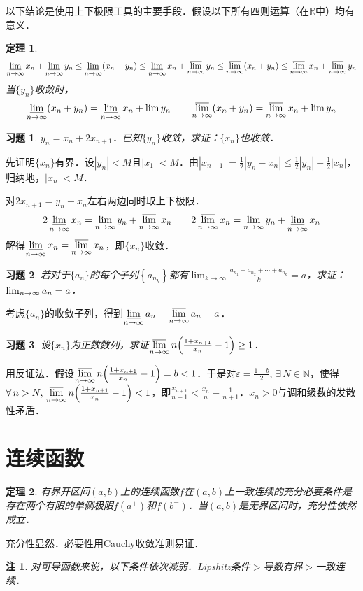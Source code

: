 \documentclass[11pt,a4paper]{ctexart}
\makeatletter
\theoremstyle{thmseries} %
\newtheorem{thm}{定理}[section]
\theoremstyle{exerseries}
\newtheorem{exer}{习题}[section]
\newtheorem*{rem}{注}
\renewenvironment{proof}[1][\proofname]{\par
  \pushQED{\qed}%
  \normalfont \topsep6\p@\@plus6\p@\relax
  \trivlist
  \item[\hskip\labelsep
        \itshape
    #1\@addpunct{}]\ignorespaces
}{%
  \popQED\endtrivlist\@endpefalse
}
\newenvironment{pf}{\begin{proof}[\bfseries\upshape 证\quad]}{\end{proof}}
\newcommand{\bra}[1]{\mathopen{}\left(#1\right)}
\newcommand{\cbra}[1]{\mathopen{}\left\{#1\right\}}
\renewcommand{\epsilon}{\varepsilon}
\newcommand{\R}{\mathbb{R}}
\newcommand{\N}{\mathbb{N}}
\def \nti {\mathnormal{n}\to\infty}
\DeclareMathOperator{\llim}{\underset{\nti}{\underline{\lim}}}
\DeclareMathOperator{\ulim}{\underset{\nti}{\overline{\lim}}}
\makeatother
\begin{document}
以下结论是使用上下极限工具的主要手段．假设以下所有四则运算（在$\overline{\R}$中）均有意义．
\begin{thm}
	\[\llim x_n+\llim y_n\leq\llim\bra{x_n+y_n}\leq\llim x_n+\ulim y_n\leq\ulim\bra{x_n+y_n}\leq\ulim x_n+\ulim y_n\]
	当$\{y_n\}$收敛时，
	\[\llim\bra{x_n+y_n}=\llim x_n+\lim y_n\qquad\ulim\bra{x_n+y_n}=\ulim x_n+\lim y_n\]
\end{thm}

\begin{exer}
	$y_n=x_n+2x_{n+1}$．已知$\{y_n\}$收敛，求证：$\{x_n\}$也收敛．
\end{exer}
\begin{pf}
	先证明$\{x_n\}$有界．设$|y_n|<M$且$|x_1|<M$．由$|x_{n+1}|=\frac{1}{2}|y_n-x_n|\leq\frac{1}{2}|y_n|+\frac{1}{2}|x_n|$，归纳地，$|x_n|<M$．

	对$2x_{n+1}=y_n-x_n$左右两边同时取上下极限．
	\[2\llim x_n=\lim_{\nti}y_n+\ulim x_n\qquad2\ulim x_n=\lim_{\nti}y_n+\llim x_n\]
	解得$\llim x_n=\ulim x_n$，即$\{x_n\}$收敛．
\end{pf}

\begin{exer}
	若对于$\{a_n\}$的每个子列$\cbra{a_{n_k}}$都有$\lim_{k\to\infty}\frac{a_{n_1}+a_{n_2}+\cdots+a_{n_k}}{k}=a$，求证：$\lim_{\nti}a_n=a$．
\end{exer}
\begin{pf}
	考虑$\{a_n\}$的收敛子列，得到$\llim a_n=\ulim a_n=a$．
\end{pf}

\begin{exer}
	设$\{x_n\}$为正数数列，求证$\ulim n\bra{\frac{1+x_{n+1}}{x_n}-1}\geq1$．
\end{exer}
\begin{pf}
	用反证法．假设$\ulim n\bra{\frac{1+x_{n+1}}{x_n}-1}=b<1$．于是对$\epsilon=\frac{1-b}{2},\,\exists\,N\in\N$，使得$\forall\,n>N,\,\ulim n\bra{\frac{1+x_{n+1}}{x_n}-1}<1$，即$\frac{x_{n+1}}{n+1}<\frac{x_n}{n}-\frac{1}{n+1}$．$x_n>0$与调和级数的发散性矛盾．
\end{pf}


\section{连续函数}
\begin{thm}
	有界开区间$(a,b)$上的连续函数$f$在$(a,b)$上一致连续的充分必要条件是存在两个有限的单侧极限$f(a^+)$和$f(b^-)$．当$(a,b)$是无界区间时，充分性依然成立．
\end{thm}
\begin{pf}
	充分性显然．必要性用Cauchy收敛准则易证．
\end{pf}
\begin{rem}
	对可导函数来说，以下条件依次减弱．Lipshitz条件$>$导数有界$>$一致连续．
\end{rem}
\end{document}
